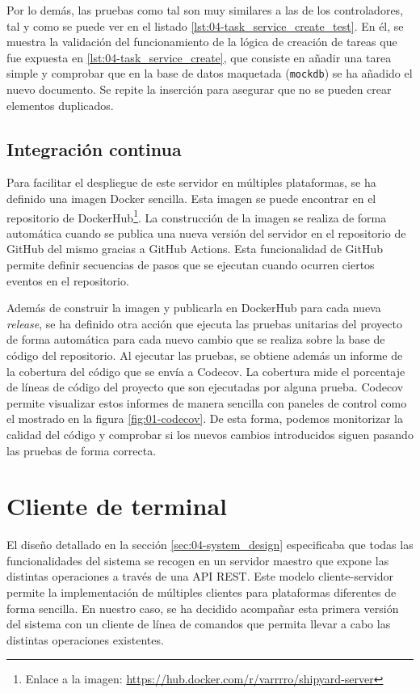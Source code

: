 Por lo demás, las pruebas como tal son muy similares a las de los controladores,
tal y como se puede ver en el listado \ref{lst:04-task_service_create_test}. En
él, se muestra la validación del funcionamiento de la lógica de creación de
tareas que fue expuesta en \ref{lst:04-task_service_create}, que consiste en
añadir una tarea simple y comprobar que en la base de datos maquetada
(\texttt{mockdb}) se ha añadido el nuevo documento. Se repite la inserción para
asegurar que no se pueden crear elementos duplicados.

\subsection{Integración continua}

Para facilitar el despliegue de este servidor en múltiples plataformas, se ha
definido una imagen Docker sencilla. Esta imagen se puede encontrar en el
repositorio de DockerHub\footnote{Enlace a la imagen:
    \url{https://hub.docker.com/r/varrrro/shipyard-server}}. La
construcción de la imagen se realiza de forma automática cuando se publica una
nueva versión del servidor en el repositorio de GitHub del mismo gracias a
GitHub Actions. Esta funcionalidad de GitHub permite definir secuencias de pasos
que se ejecutan cuando ocurren ciertos eventos en el repositorio.

Además de construir la imagen y publicarla en DockerHub para cada nueva
\textit{release}, se ha definido otra acción que ejecuta las pruebas unitarias
del proyecto de forma automática para cada nuevo cambio que se realiza sobre la
base de código del repositorio. Al ejecutar las pruebas, se obtiene además un
informe de la cobertura del código que se envía a Codecov. La cobertura mide el
porcentaje de líneas de código del proyecto que son ejecutadas por alguna
prueba. Codecov permite visualizar estos informes de manera sencilla con paneles
de control como el mostrado en la figura \ref{fig:01-codecov}. De esta forma,
podemos monitorizar la calidad del código y comprobar si los nuevos cambios
introducidos siguen pasando las pruebas de forma correcta.

\section{Cliente de terminal}

El diseño detallado en la sección \ref{sec:04-system_design} especificaba que
todas las funcionalidades del sistema se recogen en un servidor maestro que
expone las distintas operaciones a través de una API REST. Este modelo
cliente-servidor permite la implementación de múltiples clientes para
plataformas diferentes de forma sencilla. En nuestro caso, se ha decidido
acompañar esta primera versión del sistema con un cliente de línea de comandos
que permita llevar a cabo las distintas operaciones existentes.

